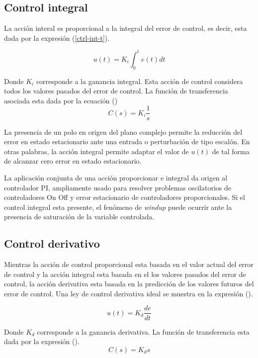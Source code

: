 \subsection{Control integral}

La acción interal es proporcional a la integral del error de control, es decir, esta dada por la expresión (\ref{ctrl-int-t}).

\begin{equation}\label{ctrl-int-t}
u(t)=K_i \int_{0}^{t}e(t)dt 
\end{equation}

Donde $K_i$ corresponde a la ganancia integral. Esta acción de control considera todos los valores pasados del error de control. La función de transferencia asociada esta dada por la ecuación ()
\begin{equation}\label{ctrl-int}
C(s)=K_i\frac{1}{s}
\end{equation}

La presencia de un polo en origen del plano complejo permite la reducción del error en estado estacionario ante una entrada o perturbación de tipo escalón. En otras palabras, la acción integral permite adaptar el valor de $u(t)$ de tal forma de alcanzar cero error en estado estacionario.

La aplicación conjunta de una acción proporcionar e integral da origen al controlador PI, ampliamente usado para resolver problemas oscilatorios de controladores On Off y error estacionario de controladores proporcionales. Si el control integral esta presente, el fenómeno de \textit{windup} puede ocurrir ante la presencia de saturación de la variable controlada.

\subsection{Control derivativo}

Mientras la acción de control proporcional esta basada en el valor actual del error de control y la acción integral esta basada en el los valores pasados del error de control, la acción derivativa esta basada en la predicción de los valores futuros del error de control. Una ley de control derivativa ideal se muestra en la expresión ().

\begin{equation}
u(t) = K_d \frac{de}{dt}
\end{equation}

Donde $K_d$ corresponde a la ganancia derivativa. La función de transferencia esta dada por la expresión ().
\begin{equation}
C(s) = K_d s
\end{equation}

